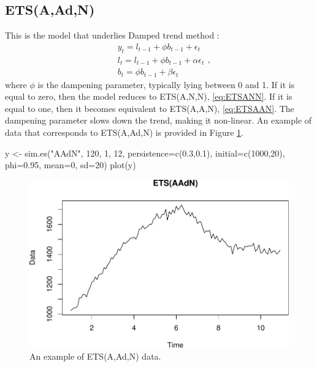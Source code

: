 \documentclass[
]{book}
\newenvironment{Shaded}{\begin{snugshade}}{\end{snugshade}}
\newcommand{\AttributeTok}[1]{\textcolor[rgb]{0.77,0.63,0.00}{#1}}
\newcommand{\DecValTok}[1]{\textcolor[rgb]{0.00,0.00,0.81}{#1}}
\newcommand{\FloatTok}[1]{\textcolor[rgb]{0.00,0.00,0.81}{#1}}
\newcommand{\FunctionTok}[1]{\textcolor[rgb]{0.00,0.00,0.00}{#1}}
\newcommand{\NormalTok}[1]{#1}
\newcommand{\OtherTok}[1]{\textcolor[rgb]{0.56,0.35,0.01}{#1}}
\newcommand{\StringTok}[1]{\textcolor[rgb]{0.31,0.60,0.02}{#1}}
\theoremstyle{definition}
\theoremstyle{definition}
\theoremstyle{definition}
\theoremstyle{definition}
\theoremstyle{remark}
\begin{document}
\hypertarget{ETSAAdN}{%
\subsection{ETS(A,Ad,N)}\label{ETSAAdN}}

This is the model that underlies Damped trend method \citep{Roberts1982}:
\begin{equation}
  \begin{aligned}
    & y_{t} = l_{t-1} + \phi b_{t-1} + \epsilon_t \\
    & l_t = l_{t-1} + \phi b_{t-1} + \alpha \epsilon_t \\
    & b_t = \phi b_{t-1} + \beta \epsilon_t
  \end{aligned} ,
  \label{eq:ETSAAdN}
\end{equation}
where \(\phi\) is the dampening parameter, typically lying between 0 and 1. If it is equal to zero, then the model reduces to ETS(A,N,N), \eqref{eq:ETSANN}. If it is equal to one, then it becomes equivalent to ETS(A,A,N), \eqref{eq:ETSAAN}. The dampening parameter slows down the trend, making it non-linear. An example of data that corresponds to ETS(A,Ad,N) is provided in Figure \ref{fig:ETSAAdNExample}.

\begin{Shaded}
\begin{Highlighting}[]
\NormalTok{y }\OtherTok{\textless{}{-}} \FunctionTok{sim.es}\NormalTok{(}\StringTok{"AAdN"}\NormalTok{, }\DecValTok{120}\NormalTok{, }\DecValTok{1}\NormalTok{, }\DecValTok{12}\NormalTok{, }\AttributeTok{persistence=}\FunctionTok{c}\NormalTok{(}\FloatTok{0.3}\NormalTok{,}\FloatTok{0.1}\NormalTok{),}
            \AttributeTok{initial=}\FunctionTok{c}\NormalTok{(}\DecValTok{1000}\NormalTok{,}\DecValTok{20}\NormalTok{), }\AttributeTok{phi=}\FloatTok{0.95}\NormalTok{, }\AttributeTok{mean=}\DecValTok{0}\NormalTok{, }\AttributeTok{sd=}\DecValTok{20}\NormalTok{)}
\FunctionTok{plot}\NormalTok{(y)}
\end{Highlighting}
\end{Shaded}

\begin{figure}
\centering
\includegraphics{adam_files/figure-latex/ETSAAdNExample-1.pdf}
\caption{\label{fig:ETSAAdNExample}An example of ETS(A,Ad,N) data.}
\end{figure}
\end{document}
